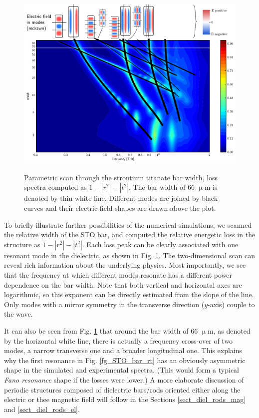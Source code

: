 \begin{figure}[ht] \centering \caption{Parametric scan through the strontium titanate bar width, loss spectra computed as $1-|r^2|-|t^2|$. The bar width of 66 $\upmu$m is denoted by thin white line. Different modes are joined by black curves and their electric field shapes are drawn above the plot.} \includegraphics[width=\textwidth]{img/STOBarC_modes2.pdf} \label{fg_STO_bar_modes} \end{figure}
To briefly illustrate further possibilities of the numerical simulations, we scanned the relative width of the STO bar, and computed the relative energetic loss in the structure as $1-|r^2|-|t^2|$. Each loss peak can be clearly associated with one resonant mode in the dielectric, as shown in Fig. \ref{fg_STO_bar_modes}. The two-dimensional scan can reveal rich information about the underlying physics. Most importantly, we see that the frequency at which different modes resonate has a different power dependence on the bar width. Note that both vertical and horizontal axes are logarithmic, so this exponent can be directly estimated from the slope of the line. Only modes with a mirror symmetry in the transverse direction ($y$-axis) couple to the wave.

It can also be seen from Fig. \ref{fg_STO_bar_modes} that around the bar width of 66 $\upmu$m, as denoted by the horizontal white line, there is actually a frequency cross-over of two modes, a narrow transverse one and a broader longitudinal one. This explains why the first resonance in Fig. \ref{fg_STO_bar_rt} has an obviously asymmetric shape in the simulated and experimental spectra. (This would form a typical \textit{Fano resonance} shape if the losses were lower.)
A more elaborate discussion of periodic structures composed of dielectric bars/rods oriented either along the electric or thee magnetic field will follow in the Sections \ref{sect_diel_rods_mag} and \ref{sect_diel_rods_el}.

